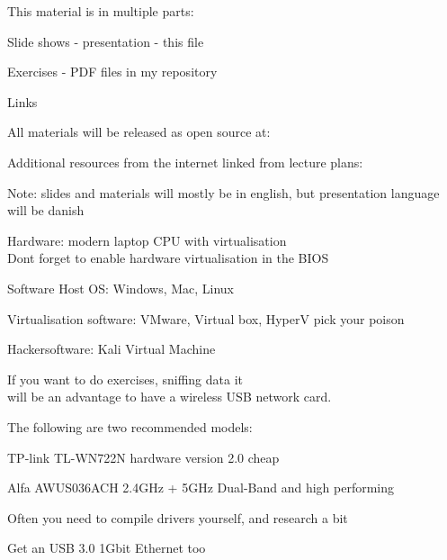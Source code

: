 \documentclass[Screen16to9,17pt]{foils}
\begin{document}
\begin{list1}
\item This material is in multiple parts:
\begin{list2}
\item Slide shows - presentation - this file
\item Exercises - PDF files in my repository
\end{list2}
\item Links
\begin{list2}
\item All materials will be released as open source at:\\
\item Additional resources from the internet linked from lecture plans:\\
\end{list2}
\end{list1}

Note: slides and materials will mostly be in english, but presentation language will be danish




\begin{list2}
\item Hardware: modern laptop CPU with virtualisation\\
Dont forget to enable hardware virtualisation in the BIOS
\item Software Host OS: Windows, Mac, Linux
\item Virtualisation software: VMware, Virtual box, HyperV pick your poison
\item Hackersoftware: Kali Virtual Machine 
\end{list2}



If you want to do exercises, sniffing data it \\
will be an advantage to have a wireless USB network card.
\begin{list2}
\item The following are two recommended models:
\item TP-link TL-WN722N hardware version 2.0 cheap
\item Alfa AWUS036ACH 2.4GHz + 5GHz Dual-Band and high performing
\item Often you need to compile drivers yourself, and research a bit
\item Get an USB 3.0 1Gbit Ethernet too
\end{list2}
\end{document}
